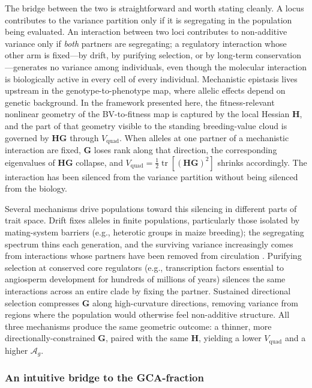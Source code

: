 \documentclass[9pt,twocolumn,twoside,lineno]{gsajnl}
\newcommand{\mat}[1]{\mathbf{#1}}
\newcommand{\tr}{\ensuremath{\operatorname{tr}}\xspace}
\newcommand{\Ag}{\ensuremath{\mathcal{A}_{g}}\xspace}
\newcommand{\Vquad}{\ensuremath{V_{\text{quad}}}\xspace}
\begin{document}
The bridge between the two is straightforward and worth stating cleanly. A locus contributes to the variance partition only if it is segregating in the population being evaluated. An interaction between two loci contributes to non-additive variance only if \emph{both} partners are segregating; a regulatory interaction whose other arm is fixed---by drift, by purifying selection, or by long-term conservation---generates no variance among individuals, even though the molecular interaction is biologically active in every cell of every individual. Mechanistic epistasis lives upstream in the genotype-to-phenotype map, where allelic effects depend on genetic background. In the framework presented here, the fitness-relevant nonlinear geometry of the BV-to-fitness map is captured by the local Hessian $\mat{H}$, and the part of that geometry visible to the standing breeding-value cloud is governed by $\mat{H}\mat{G}$ through $\Vquad$. When alleles at one partner of a mechanistic interaction are fixed, $\mat{G}$ loses rank along that direction, the corresponding eigenvalues of $\mat{H}\mat{G}$ collapse, and $\Vquad = \tfrac{1}{2}\tr[(\mat{H}\mat{G})^2]$ shrinks accordingly. The interaction has been silenced from the variance partition without being silenced from the biology.

Several mechanisms drive populations toward this silencing in different parts of trait space. Drift fixes alleles in finite populations, particularly those isolated by mating-system barriers (e.g., heterotic groups in maize breeding); the segregating spectrum thins each generation, and the surviving variance increasingly comes from interactions whose partners have been removed from circulation \citep{Technow2021}. Purifying selection at conserved core regulators (e.g., transcription factors essential to angiosperm development for hundreds of millions of years) silences the same interactions across an entire clade by fixing the partner. Sustained directional selection compresses $\mat{G}$ along high-curvature directions, removing variance from regions where the population would otherwise feel non-additive structure. All three mechanisms produce the same geometric outcome: a thinner, more directionally-constrained $\mat{G}$, paired with the same $\mat{H}$, yielding a lower $\Vquad$ and a higher \Ag.

\subsubsection*{An intuitive bridge to the GCA-fraction}
\end{document}
